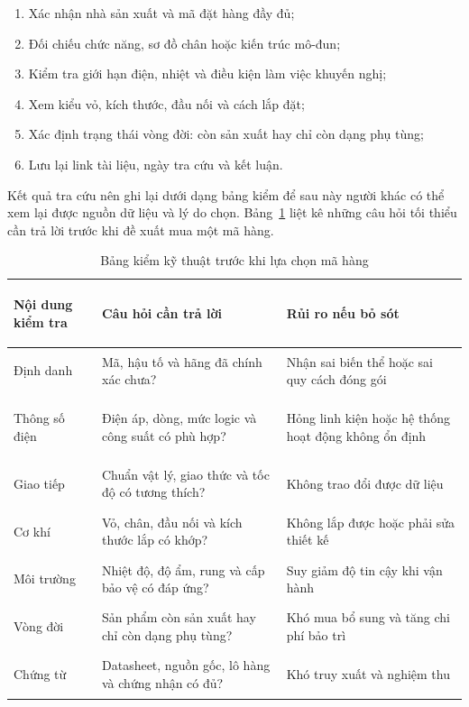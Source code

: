 \begin{enumerate}[label=\arabic*)]
  \item Xác nhận nhà sản xuất và mã đặt hàng đầy đủ;
  \item Đối chiếu chức năng, sơ đồ chân hoặc kiến trúc mô-đun;
  \item Kiểm tra giới hạn điện, nhiệt và điều kiện làm việc khuyến nghị;
  \item Xem kiểu vỏ, kích thước, đầu nối và cách lắp đặt;
  \item Xác định trạng thái vòng đời: còn sản xuất hay chỉ còn dạng phụ tùng;
  \item Lưu lại link tài liệu, ngày tra cứu và kết luận.
\end{enumerate}

Kết quả tra cứu nên ghi lại dưới dạng bảng kiểm để sau này người khác có thể
xem lại được nguồn dữ liệu và lý do chọn. Bảng~\ref{tab:technical-checklist}
liệt kê những câu hỏi tối thiểu cần trả lời trước khi đề xuất mua một mã hàng.

\begin{table}[H]
\centering
\caption{Bảng kiểm kỹ thuật trước khi lựa chọn mã hàng}
\label{tab:technical-checklist}
\footnotesize
\renewcommand{\arraystretch}{1.0}
\begin{tabularx}{\textwidth}{>{\bfseries\raggedright\arraybackslash}p{3.4cm} >{\raggedright\arraybackslash}X >{\raggedright\arraybackslash}X}
\toprule
Nội dung kiểm tra & Câu hỏi cần trả lời & Rủi ro nếu bỏ sót \\
\midrule
Định danh & Mã, hậu tố và hãng đã chính xác chưa? & Nhận sai biến thể hoặc sai quy cách đóng gói \\
Thông số điện & Điện áp, dòng, mức logic và công suất có phù hợp? & Hỏng linh kiện hoặc hệ thống hoạt động không ổn định \\
Giao tiếp & Chuẩn vật lý, giao thức và tốc độ có tương thích? & Không trao đổi được dữ liệu \\
Cơ khí & Vỏ, chân, đầu nối và kích thước lắp có khớp? & Không lắp được hoặc phải sửa thiết kế \\
Môi trường & Nhiệt độ, độ ẩm, rung và cấp bảo vệ có đáp ứng? & Suy giảm độ tin cậy khi vận hành \\
Vòng đời & Sản phẩm còn sản xuất hay chỉ còn dạng phụ tùng? & Khó mua bổ sung và tăng chi phí bảo trì \\
Chứng từ & Datasheet, nguồn gốc, lô hàng và chứng nhận có đủ? & Khó truy xuất và nghiệm thu \\
\bottomrule
\end{tabularx}
\end{table}

